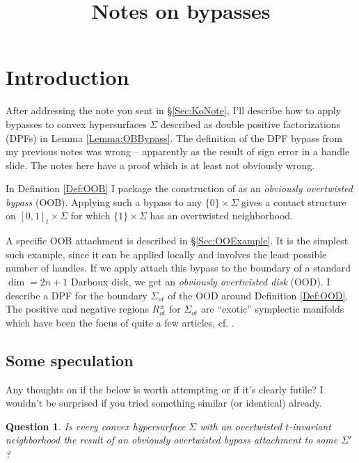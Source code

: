 \documentclass[11pt]{amsart}
\title[Notes on bypasses]{Notes on bypasses}
\newtheorem{q}[thm]{Question}
\begin{document}
\maketitle

\section{Introduction}

After addressing the note you sent in \S \ref{Sec:KoNote}, I'll describe how to apply bypasses to convex hypersurfaces $\Sigma$ described as double positive factorizations (DPFs) in Lemma \ref{Lemma:OBBypass}. The definition of the DPF bypass from my previous notes was wrong -- apparently as the result of sign error in a handle slide. The notes here have a proof which is at least not obviously wrong.

In Definition \ref{Def:OOB} I package the construction of \cite[\S 10]{HH:Bypass} as an \emph{obviously overtwisted bypass} (OOB). Applying such a bypass to any $\{ 0 \} \times \Sigma$ gives a contact structure on $[0, 1]_{t} \times \Sigma$ for which $\{ 1 \} \times \Sigma$ has an overtwisted neighborhood.

A specific OOB attachment is described in \S \ref{Sec:OOExample}. It is the simplest such example, since it can be applied locally and involves the least possible number of handles. If we apply attach this bypass to the boundary of a standard $\dim = 2n+1$ Darboux disk, we get an \emph{obviously overtwisted disk} (OOD). I describe a DPF for the boundary $\Sigma_{ot}$ of the OOD around Definition \ref{Def:OOD}. The positive and negative regions $R^{\pm}_{ot}$ for $\Sigma_{ot}$ are ``exotic'' symplectic manifolds which have been the focus of quite a few articles, cf. \cite[\S 3.5]{CM:LegendrianFronts}.

\subsection{Some speculation}

Any thoughts on if the below is worth attempting or if it's clearly futile? I wouldn't be surprised if you tried something similar (or identical) already.

\begin{q}\label{Q:OTCriterion}
Is every convex hypersurface $\Sigma$ with an overtwisted $t$-invariant neighborhood the result of an obviously overtwisted bypass attachment to some $\Sigma'$?
\end{q}
\end{document}
